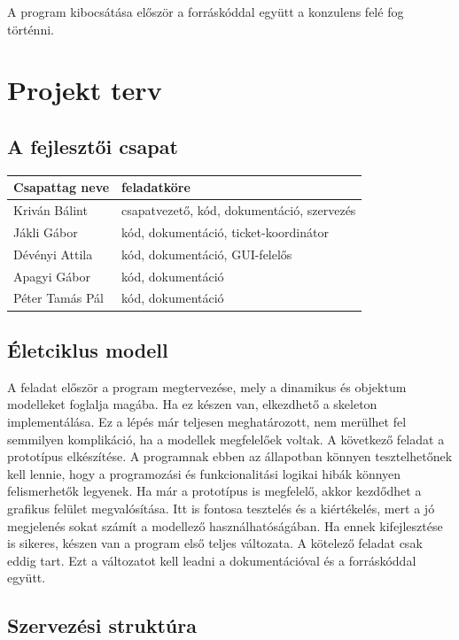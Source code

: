 A program kibocsátása először a forráskóddal együtt a konzulens felé fog történni.

\section{Projekt terv}
\label{sec:projectplan}

\subsection{A fejlesztői csapat}

\begin{center}
\begin{tabular}{l | l}
	\textbf{Csapattag neve} & \textbf{feladatköre} \\
	\hline
	Kriván Bálint & csapatvezető, kód, dokumentáció, szervezés \\ 
	Jákli Gábor & kód, dokumentáció, ticket-koordinátor \\ 
	Dévényi Attila & kód, dokumentáció, GUI-felelős \\ 
	Apagyi Gábor & kód, dokumentáció \\ 
	Péter Tamás Pál & kód, dokumentáció 
\end{tabular}
\end{center}

\subsection{Életciklus modell}

A feladat először a program megtervezése, mely a dinamikus és objektum modelleket foglalja magába. Ha ez készen van, elkezdhető a skeleton implementálása. Ez a lépés már teljesen meghatározott, nem merülhet fel semmilyen komplikáció, ha a modellek megfelelőek voltak.
A következő feladat a prototípus elkészítése. A programnak ebben az állapotban könnyen tesztelhetőnek kell lennie, hogy a programozási és funkcionalitási logikai hibák könnyen felismerhetők legyenek. Ha már a prototípus is megfelelő, akkor kezdődhet a grafikus felület megvalósítása. Itt is fontosa tesztelés és a kiértékelés, mert a jó megjelenés sokat számít a modellező használhatóságában. Ha ennek kifejlesztése is sikeres, készen van a program első teljes változata. A kötelező feladat csak eddig tart. Ezt a változatot kell leadni a dokumentációval és a forráskóddal együtt.

\subsection{Szervezési struktúra}
\label{sec:orgstructure}

